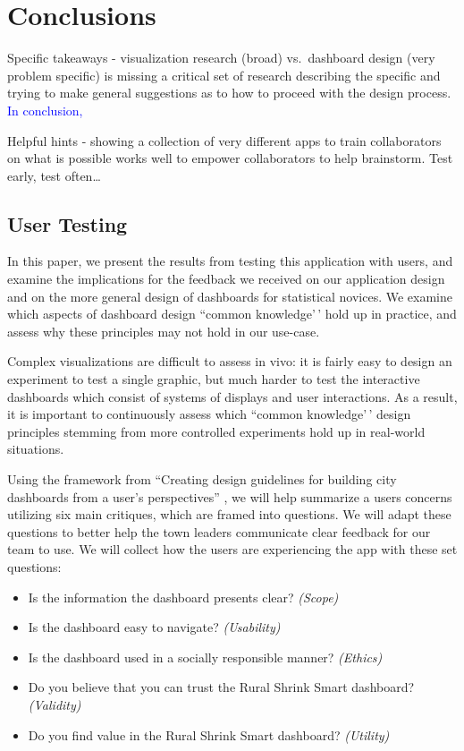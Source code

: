 \documentclass[letterpaper,inpress]{jdsart}
\begin{document}
\section {Conclusions}

Specific takeaways - visualization research (broad) vs.~dashboard design (very problem specific) is missing a critical set of research describing the specific and trying to make general suggestions as to how to proceed with the design process.
{\textcolor{blue}{In conclusion, }}

Helpful hints - showing a collection of very different apps to train collaborators on what is possible works well to empower collaborators to help brainstorm.
Test early, test often\ldots{}

\subsection{User Testing}

In this paper, we present the results from testing this application with users, and examine the implications for the feedback we received on our application design and on the more general design of dashboards for statistical novices. We examine which aspects of dashboard design ``common knowledge'\,' hold up in practice, and assess why these principles may not hold in our use-case.

Complex visualizations are difficult to assess in vivo: it is fairly easy to design an experiment to test a single graphic, but much harder to test the interactive dashboards which consist of systems of displays and user interactions. As a result, it is important to continuously assess which ``common knowledge'\,' design principles stemming from more controlled experiments hold up in real-world situations.

Using the framework from ``Creating design guidelines for building city dashboards from a user's perspectives'' \citep{lee}, we will help summarize a users concerns utilizing six main critiques, which are framed into questions. We will adapt these questions to better help the town leaders communicate clear feedback for our team to use. We will collect how the users are experiencing the app with these set questions:

\begin{itemize}
\item Is the information the dashboard presents clear? \textit{(Scope)}
\item Is the dashboard easy to navigate? \textit{(Usability)}
\item Is the dashboard used in a socially responsible manner? \textit{(Ethics)}
\item Do you believe that you can trust the Rural Shrink Smart dashboard? \textit{(Validity)}
\item Do you find value in the Rural Shrink Smart dashboard? \textit{(Utility)}
\end{itemize}
\end{document}
